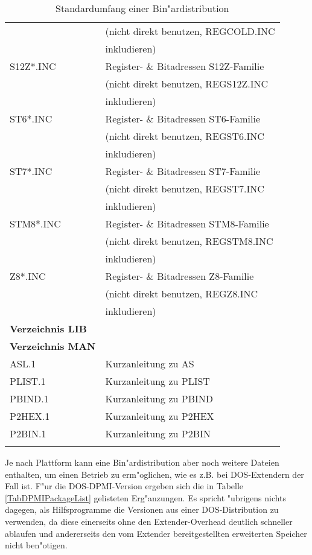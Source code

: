 \documentclass[12pt,a4paper,twoside]{report}
\begin{document}
\begin{center}
\begin{longtable}{|l|l|}
                  & (nicht direkt benutzen, REGCOLD.INC \\
                  & inkludieren) \\
S12Z\/*.INC       & Register- \& Bitadressen S12Z-Familie \\
                  & (nicht direkt benutzen, REGS12Z.INC \\
                  & inkludieren) \\
ST6\/*.INC        & Register- \& Bitadressen ST6-Familie \\
                  & (nicht direkt benutzen, REGST6.INC \\
                  & inkludieren) \\
ST7\/*.INC        & Register- \& Bitadressen ST7-Familie \\
                  & (nicht direkt benutzen, REGST7.INC \\
                  & inkludieren) \\
STM8\/*.INC       & Register- \& Bitadressen STM8-Familie \\
                  & (nicht direkt benutzen, REGSTM8.INC \\
                  & inkludieren) \\
Z8\/*.INC         & Register- \& Bitadressen Z8-Familie \\
                  & (nicht direkt benutzen, REGZ8.INC \\
                  & inkludieren) \\
\hline
{\bf Verzeichnis LIB} & \\
\hline
{\bf Verzeichnis MAN} & \\
\hline
ASL.1             & Kurzanleitung zu AS \\
PLIST.1           & Kurzanleitung zu PLIST \\
PBIND.1           & Kurzanleitung zu PBIND \\
P2HEX.1           & Kurzanleitung zu P2HEX \\
P2BIN.1           & Kurzanleitung zu P2BIN \\
\hline
\caption{Standardumfang einer Bin"ardistribution
 \label{TabCommonPackageList}}
\end{longtable}\end{center}

Je nach Plattform kann eine Bin"ardistribution aber noch weitere Dateien
enthalten, um einen Betrieb zu erm"oglichen, wie es z.B. bei DOS-Extendern
der Fall ist.  F"ur die DOS-DPMI-Version  ergeben
sich die in Tabelle \ref{TabDPMIPackageList} gelisteten Erg"anzungen.  Es
spricht "ubrigens nichts dagegen, als Hilfsprogramme die Versionen aus
einer DOS-Distribution zu verwenden, da diese einerseits ohne den
Extender-Overhead deutlich schneller ablaufen und andererseits den
vom Extender bereitgestellten erweiterten Speicher nicht ben"otigen.
\end{document}
